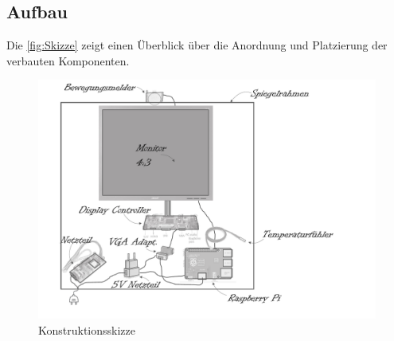 \subsection{Aufbau}
Die \autoref{fig:Skizze} zeigt einen Überblick über die Anordnung und Platzierung der verbauten Komponenten. 
\begin{figure}
	\includegraphics[scale=0.5, trim=0mm 10mm 60mm 10mm]{bilder/smartMirrorExplosionsskizze.pdf}
	\caption{Konstruktionsskizze}
	\label{fig:Skizze}
\end{figure}

